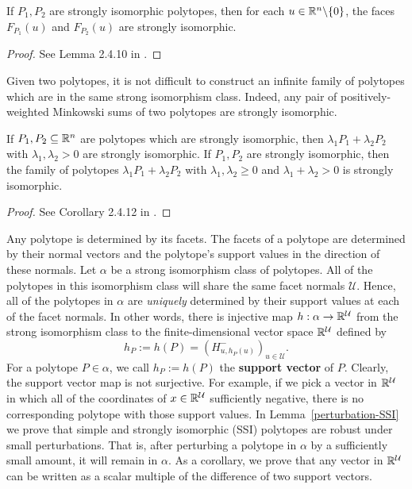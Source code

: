 \documentclass{puthesis-UG}
\begin{document}
\begin{lem} \label{family-of-strongly-isomorphic}
	If $P_1, P_2$ are strongly isomorphic polytopes, then for each $u \in \mathbb{R}^n \backslash \{0\}$, the faces $F_{P_1}(u)$ and $F_{P_2}(u)$ are strongly isomorphic. 
\end{lem}
\begin{proof}
	See Lemma 2.4.10 in \cite{schneider_2013}. 
\end{proof}

Given two polytopes, it is not difficult to construct an infinite family of polytopes which are in the same strong isomorphism class. Indeed, any pair of positively-weighted Minkowski sums of two polytopes are strongly isomorphic. 

\begin{prop} \label{families-of-strongly-isomorphic}
	If $P_1, P_2 \subseteq \mathbb{R}^n$ are polytopes which are strongly isomorphic, then $\lambda_1 P_1 + \lambda_2 P_2$ with $\lambda_1, \lambda_2 > 0$ are strongly isomorphic. If $P_1, P_2$ are strongly isomorphic, then the family of polytopes $\lambda_1 P_1 + \lambda_2 P_2$ with $\lambda_1, \lambda_2 \geq 0$ and $\lambda_1 + \lambda_2 > 0$ is strongly isomorphic.
\end{prop}

\begin{proof}
	See Corollary 2.4.12 in \cite{schneider_2013}.
\end{proof}

Any polytope is determined by its facets. The facets of a polytope are determined by their normal vectors and the polytope's support values in the direction of these normals. Let $\alpha$ be a strong isomorphism class of polytopes. All of the polytopes in this isomorphism class will share the same facet normals $\mathcal{U}$. Hence, all of the polytopes in $\alpha$ are \textit{uniquely} determined by their support values at each of the facet normals. In other words, there is injective map $h : \alpha \to \mathbb{R}^\mathcal{U}$ from the strong isomorphism class to the finite-dimensional vector space $\mathbb{R}^{\mathcal{U}}$ defined by 
\[
	h_P := h(P) = \left ( H^-_{u, h_P(u)}\right )_{u \in \mathcal{U}}.
\]
For a polytope $P \in \alpha$, we call $h_P := h(P)$ the \textbf{support vector} of $P$. Clearly, the support vector map is not surjective. For example, if we pick a vector in $\mathbb{R}^\mathcal{U}$ in which all of the coordinates of $x \in \mathbb{R}^{\mathcal{U}}$ sufficiently negative, there is no corresponding polytope with those support values. In Lemma~\ref{perturbation-SSI} we prove that simple and strongly isomorphic (SSI) polytopes are robust under small perturbations. That is, after perturbing a polytope in $\alpha$ by a sufficiently small amount, it will remain in $\alpha$. As a corollary, we prove that any vector in $\mathbb{R}^{\mathcal{U}}$ can be written as a scalar multiple of the difference of two support vectors. 
\end{document}
